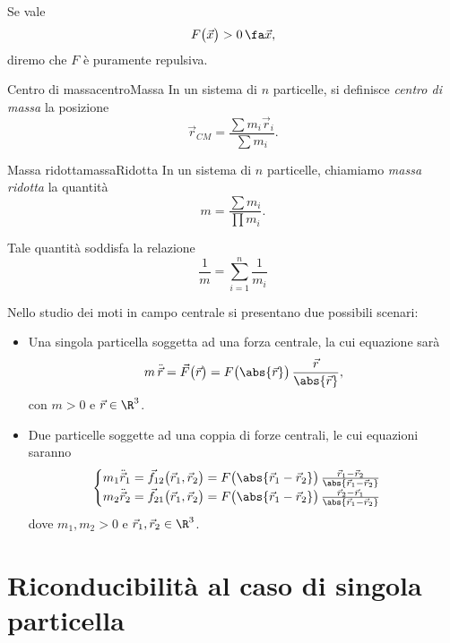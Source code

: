 \begin{notz}
	Se vale
	\[
		F\big(\vec{x}\big) > 0 \,\fa \vec{x},
	\]
	diremo che \(F\) è puramente repulsiva.
\end{notz}

\begin{defn}{Centro di massa}{centroMassa}
	In un sistema di \(n\) particelle, si definisce \emph{centro di massa} la posizione
	\[
		\vec{r}_{CM} = \frac{\sum m_i \vec{r}_i}{\sum m_i}.
	\]
\end{defn}

\begin{defn}{Massa ridotta}{massaRidotta}
	In un sistema di \(n\) particelle, chiamiamo \emph{massa ridotta} la quantità
	\[
		m = \frac{\sum m_i}{\prod m_i}.
	\]
\end{defn}

\begin{oss}
	Tale quantità soddisfa la relazione
	\[
		\frac{1}{m} = \sum_{i=1}^n \frac{1}{m_i}
	\]
\end{oss}

Nello studio dei moti in campo centrale si presentano due possibili scenari:
\begin{itemize}
	\item Una singola particella soggetta ad una forza centrale, la cui equazione sarà
	      \[
		      m\,\ddot{\vec{r}} = \vec{F}\big(\vec{r}\big) = F\big(\abs{\vec{r}}\big)\,\frac{\vec{r}}{\abs{\vec{r}}},
	      \]
	      con \(m>0\) e \(\vec{r}\in\R^3\).
	\item Due particelle soggette ad una coppia di forze centrali, le cui equazioni saranno
	      \[
		      \begin{cases}
			      m_1\ddot{\vec{r}}_1 = \vec{f}_{12}\big(\vec{r}_1,\vec{r}_2\big) = F\big(\abs{\vec{r}_1-\vec{r}_2}\big)\,\frac{\vec{r}_1-\vec{r}_2}{\abs{\vec{r}_1-\vec{r}_2}} \\
			      m_2\ddot{\vec{r}}_2 = \vec{f}_{21}\big(\vec{r}_1,\vec{r}_2\big) = F\big(\abs{\vec{r}_1-\vec{r}_2}\big)\,\frac{\vec{r}_2-\vec{r}_1}{\abs{\vec{r}_1-\vec{r}_2}}
		      \end{cases}
	      \]
	      dove \(m_1,m_2>0\) e \(\vec{r}_1,\vec{r}_2\in \R^3\).
\end{itemize}

\section{Riconducibilità al caso di singola particella}

